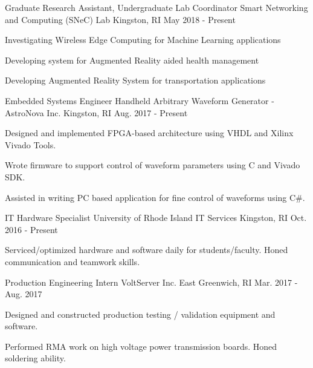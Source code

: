 \begin{cventries}
  \cventry
    {Graduate Research Assistant, Undergraduate Lab Coordinator}
    {Smart Networking and Computing (SNeC) Lab}
    {Kingston, RI}
    {May 2018 - Present}
    {
      \begin{cvitems}
        \item{Investigating Wireless Edge Computing for Machine Learning applications}
        \item{Developing system for Augmented Reality aided health management}
        \item{Developing Augmented Reality System for transportation applications} 
      \end{cvitems}
    }
    
  \cventry
    {Embedded Systems Engineer}
    {Handheld Arbitrary Waveform Generator - AstroNova Inc.}
    {Kingston, RI}
    {Aug. 2017 - Present}
    {
      \begin{cvitems}
        \item {Designed and implemented FPGA-based architecture using VHDL and Xilinx Vivado Tools.}
        \item {Wrote firmware to support control of waveform parameters using C and Vivado SDK.}
        \item {Assisted in writing PC based application for fine control of waveforms using C\#.}
      \end{cvitems}
    }
\cventry
    {IT Hardware Specialist}
    {University of Rhode Island IT Services}
    {Kingston, RI}
    {Oct. 2016 - Present}
    {
      \begin{cvitems}
        \item {Serviced/optimized hardware and software daily for students/faculty. Honed communication and teamwork skills.}
      \end{cvitems}
    }
  \cventry
    {Production Engineering Intern}
    {VoltServer Inc.}
    {East Greenwich, RI}
    {Mar. 2017 - Aug. 2017}
    {
      \begin{cvitems}
        \item {Designed and constructed production testing / validation equipment and software.}
        \item {Performed RMA work on high voltage power transmission boards. Honed soldering ability.}
      \end{cvitems}
    }
 \end{cventries}